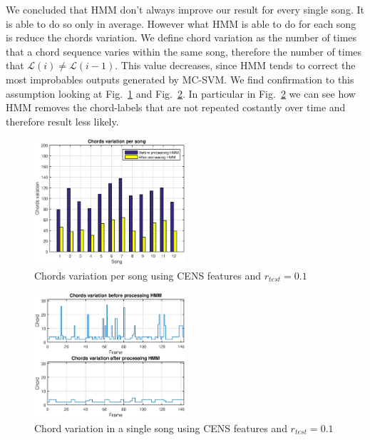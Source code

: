 We concluded that HMM don't always improve our result for every single song. It is able to do so only in average. However what HMM is able to do for each song is reduce the chords variation. We define chord variation as the number of times that a chord sequence varies within the same song, therefore the number of times that $\mathcal{L}(i) \neq \mathcal{L}(i-1)$. This value decreases, since HMM tends to correct the most improbables outputs generated by MC-SVM. We find confirmation to this assumption looking at
Fig.~\ref{fig:smoothmulti} and Fig.~\ref{fig:smoothsingle}. In particular in Fig.~\ref{fig:smoothsingle} we can see how HMM removes the chord-labels that are not repeated costantly over time and therefore result less likely.

\begin{figure} [h!]
	\includegraphics[width=0.5\textwidth]{img/Result_HMM/SMOOTHING/SmoothPerSongCENS0109}
	\caption{Chords variation per song using CENS features and $r_{test}=0.1$}
	\label{fig:smoothmulti}
\end{figure}

\begin{figure} [h!]
	\includegraphics[width=0.5\textwidth]{img/Result_HMM/SMOOTHING/SmoothSingleSongCENS0109}
	\caption{Chord variation in a single song using CENS features and $r_{test}=0.1$}
	\label{fig:smoothsingle}
\end{figure}
